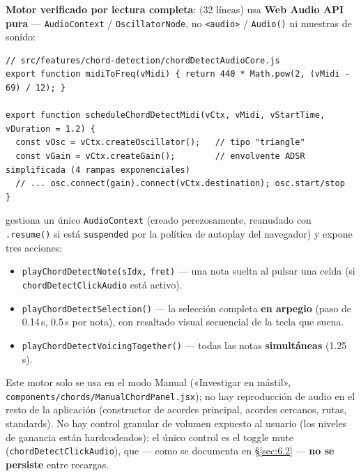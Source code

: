 \documentclass[a4paper,11pt,oneside]{report}
\newcommand{\Sref}[1]{\S\ref{#1}}
\begin{document}
\textbf{Motor verificado por lectura completa}: \texttt{} (32 líneas) usa \textbf{Web Audio API pura} --- \lstinline!AudioContext! / \lstinline!OscillatorNode!, no \lstinline!<audio>! / \lstinline!Audio()! ni muestras de sonido:

\begin{lstlisting}
// src/features/chord-detection/chordDetectAudioCore.js
export function midiToFreq(vMidi) { return 440 * Math.pow(2, (vMidi - 69) / 12); }

export function scheduleChordDetectMidi(vCtx, vMidi, vStartTime, vDuration = 1.2) {
  const vOsc = vCtx.createOscillator();   // tipo "triangle"
  const vGain = vCtx.createGain();        // envolvente ADSR simplificada (4 rampas exponenciales)
  // ... osc.connect(gain).connect(vCtx.destination); osc.start/stop
}
\end{lstlisting}

\texttt{} gestiona un único \lstinline!AudioContext! (creado perezosamente, reanudado con \lstinline!.resume()! si está \lstinline!suspended! por la política de autoplay del navegador) y expone tres acciones:

\begingroup
\setlength{\emergencystretch}{5em}
\begin{itemize}
\item \lstinline!playChordDetectNote(sIdx,! \lstinline!fret)! --- una nota suelta al pulsar una celda (si \lstinline!chordDetectClickAudio! está activo).
\item \lstinline!playChordDetectSelection()! --- la selección completa \textbf{en arpegio} (paso de 0.14\,s, 0.5\,s por nota), con resaltado visual secuencial de la tecla que suena.
\item \lstinline!playChordDetectVoicingTogether()! --- todas las notas \textbf{simultáneas} (1.25\,s).
\end{itemize}
\endgroup

Este motor solo se usa en el modo Manual («Investigar en mástil», \lstinline!components/chords/ManualChordPanel.jsx!); no hay reproducción de audio en el resto de la aplicación (constructor de acordes principal, acordes cercanos, rutas, standards). No hay control granular de volumen expuesto al usuario (los niveles de ganancia están hardcodeados); el único control es el toggle mute (\lstinline!chordDetectClickAudio!), que --- como se documenta en \Sref{sec:6.2} --- \textbf{no se persiste} entre recargas.
\end{document}

